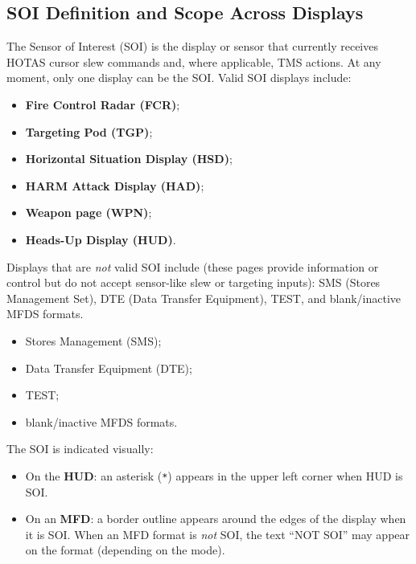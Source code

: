 \documentclass[11pt, a4paper, twoside]{report}
\begin{document}
\subsection{SOI Definition and Scope Across Displays}
\label{sec:C4-S1-S1}

The Sensor of Interest (SOI) is the display or sensor that currently receives HOTAS cursor slew commands and, where applicable, TMS actions. At any moment, only one display can be the SOI. Valid SOI displays include:

\begin{itemize}
    \item \textbf{Fire Control Radar (FCR)};
    \item \textbf{Targeting Pod (TGP)};
    \item \textbf{Horizontal Situation Display (HSD)};
    \item \textbf{HARM Attack Display (HAD)};
    \item \textbf{Weapon page (WPN)};
    \item \textbf{Heads-Up Display (HUD)}.
\end{itemize}

Displays that are \textit{not} valid SOI include (these pages provide information or control but do not accept sensor-like slew or targeting inputs): SMS (Stores Management Set), DTE (Data Transfer Equipment), TEST, and blank/inactive MFDS formats.

\begin{itemize}
    \item {Stores Management (SMS)};
    \item {Data Transfer Equipment (DTE)};
    \item {TEST};
    \item {blank/inactive MFDS formats}.
    \end{itemize}

The SOI is indicated visually:
\begin{itemize}
    \item On the \textbf{HUD}: an asterisk (\texttt{*}) appears in the upper left corner when HUD is SOI.
    \item On an \textbf{MFD}: a border outline appears around the edges of the display when it is SOI. When an MFD format is \textit{not} SOI, the text ``NOT SOI'' may appear on the format (depending on the mode).
\end{itemize}
\end{document}
